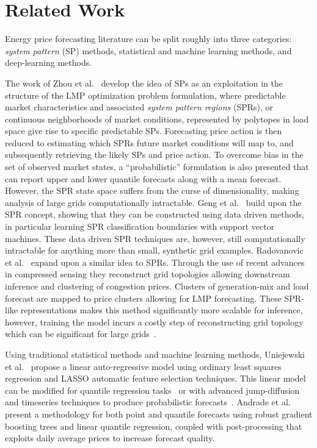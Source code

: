 \section{Related Work}\label{sec:related-work}

Energy price forecasting literature can be split roughly into three categories: \textit{system pattern} (SP)
methods, statistical and machine learning methods, and deep-learning methods.

The work of Zhou et al.~\cite{5741753} develop the idea of SPs as an exploitation in the structure of the LMP optimization
problem formulation, where predictable market characteristics and associated \textit{system pattern regions} (SPRs), or
continuous neighborhoods of market conditions, represented by polytopes in load space give rise to specific predictable SPs.
Forecasting price action is then reduced to estimating which SPRs future market conditions will map to, and subsequently
retrieving the likely SPs and price action.
To overcome bias in the set of observed market states, a ``probabilistic'' formulation is also presented that can report
upper and lower quantile forecasts along with a mean forecast.
However, the SPR state space suffers from the curse of dimensionality, making analysis of large grids computationally
intractable.
Geng et al.~\cite{7478156} build upon the SPR concept, showing that they can be constructed using data driven
methods, in particular learning SPR classification boundaries with support vector machines.
These data driven SPR techniques are, however, still computationally intractable for anything more than small, synthetic
grid examples.
Radovanovic et al.~\cite{8733097} expand upon a similar idea to SPRs.
Through the use of recent advances in compressed sensing they reconstruct grid topologies allowing downstream inference
and clustering of congestion prices.
Clusters of generation-mix and load forecast are mapped to price clusters allowing for LMP forecasting.
These SPR-like representations makes this method significantly more scalable for inference, however, training
the model incurs a costly step of reconstructing grid topology which can be significant for large grids~\cite{7226869}.

Using traditional statistical methods and machine learning methods, Uniejewski et al.~\cite{en9080621} propose a linear
auto-regressive model using ordinary least squares regression and LASSO automatic feature selection techniques.
This linear model can be modified for quantile regression tasks~\cite{UNIEJEWSKI2021105121} or with advanced
jump-diffusion and timeseries techniques to produce probabilistic forecasts~\cite{MUNIAIN20201193}.
Andrade et al.~\cite{00000} present a methodology for both point and quantile forecasts using robust gradient boosting
trees and linear quantile regression, coupled with post-processing that exploits daily average prices to increase
forecast quality.

